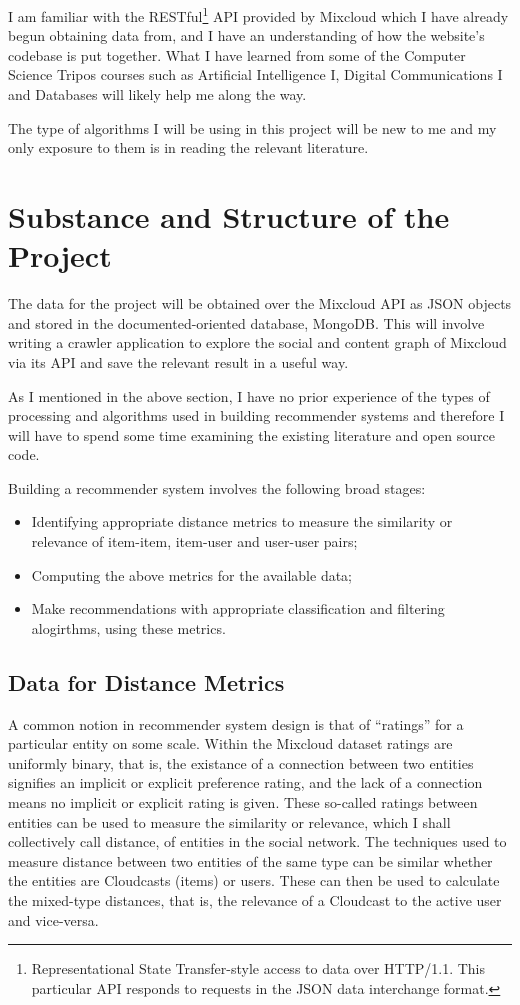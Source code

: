 I am familiar with the RESTful\footnote{Representational State Transfer-style access to data over HTTP/1.1. This particular API responds to requests in the JSON data interchange format.} API provided by Mixcloud which I have already begun obtaining data from, and I have an understanding of how the website's codebase is put together. What I have learned from some of the Computer Science Tripos courses such as Artificial Intelligence I, Digital Communications I and Databases will likely help me along the way.

The type of algorithms I will be using in this project will be new to me and my only exposure to them is in reading the relevant literature.
  
\section{Substance and Structure of the Project}

The data for the project will be obtained over the Mixcloud API as JSON objects and stored in the documented-oriented database, MongoDB. This will involve writing a crawler application to explore the social and content graph of Mixcloud via its API and save the relevant result in a useful way.

As I mentioned in the above section, I have no prior experience of the types of processing and algorithms used in building recommender systems and therefore I will have to spend some time examining the existing literature and open source code.

Building a recommender system involves the following broad stages: 
\begin{itemize}
 \item Identifying appropriate distance metrics to measure the similarity or relevance of item-item, item-user and user-user pairs;
 \item Computing the above metrics for the available data;
 \item Make recommendations with appropriate classification and filtering alogirthms, using these metrics.
\end{itemize}

\subsection*{Data for Distance Metrics}


A common notion in recommender system design is that of ``ratings'' for a particular entity on some scale. Within the Mixcloud dataset ratings are uniformly binary, that is, the existance of a connection between two entities signifies an implicit or explicit preference rating, and the lack of a connection means no implicit or explicit rating is given. These so-called ratings between entities can be used to measure the similarity or relevance, which I shall collectively call distance, of entities in the social network. The techniques used to measure distance between two entities of the same type can be similar whether the entities are Cloudcasts (items) or users. These can then be used to calculate the mixed-type distances, that is, the relevance of a Cloudcast to the active user and vice-versa.

